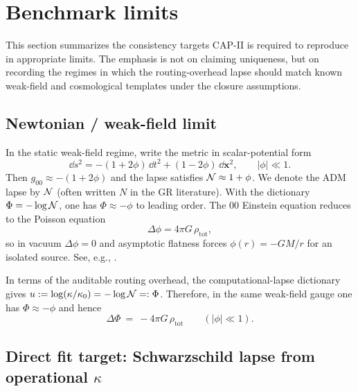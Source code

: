 \section{Benchmark limits}
\label{sec:benchmarks}

This section summarizes the consistency targets CAP-II is required to reproduce in appropriate limits.
The emphasis is not on claiming uniqueness, but on recording the regimes in which the routing-overhead lapse should match known weak-field and cosmological templates under the closure assumptions.

\subsection{Newtonian / weak-field limit}
\label{subsec:newtonian_limit}

In the static weak-field regime, write the metric in scalar-potential form
\begin{equation}
  \dd s^2 = -(1+2\phi)\,\dd t^2 + (1-2\phi)\,\dd\mathbf{x}^2,
  \qquad |\phi|\ll 1.
\end{equation}
Then $g_{00}\approx -(1+2\phi)$ and the lapse satisfies $\mathcal{N}\approx 1+\phi$.
We denote the ADM lapse by $\mathcal{N}$ (often written $N$ in the GR literature).
With the dictionary $\Phi=-\log\mathcal{N}$, one has $\Phi\approx -\phi$ to leading order.
The $00$ Einstein equation reduces to the Poisson equation
\begin{equation}
  \Delta\phi = 4\pi G\,\rho_{\mathrm{tot}},
\end{equation}
so in vacuum $\Delta\phi=0$ and asymptotic flatness forces $\phi(r)=-GM/r$ for an isolated source.
See, e.g., \cite{Wald1984,Carroll2004}.
\par
\noindent In terms of the auditable routing overhead, the computational-lapse dictionary gives
$u:=\log(\kappa/\kappa_0)=-\log\mathcal{N}=:\Phi$.
Therefore, in the same weak-field gauge one has $\Phi\approx -\phi$ and hence
\begin{equation}
  \Delta\Phi\ =\ -4\pi G\,\rho_{\mathrm{tot}}
  \qquad (|\phi|\ll 1).
\end{equation}

\subsection{Direct fit target: Schwarzschild lapse from operational \texorpdfstring{$\kappa$}{kappa}}
\label{subsec:schwarzschild_fit}

